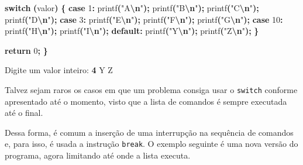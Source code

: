 \documentclass[
  11pt,
  a4paper,
]{scrbook}
\newenvironment{Shaded}{\begin{snugshade}}{\end{snugshade}}
\newcommand{\ControlFlowTok}[1]{\textcolor[rgb]{0.13,0.29,0.53}{\textbf{#1}}}
\newcommand{\DecValTok}[1]{\textcolor[rgb]{0.00,0.00,0.81}{#1}}
\newcommand{\KeywordTok}[1]{\textcolor[rgb]{0.13,0.29,0.53}{\textbf{#1}}}
\newcommand{\NormalTok}[1]{#1}
\newcommand{\OperatorTok}[1]{\textcolor[rgb]{0.81,0.36,0.00}{\textbf{#1}}}
\newcommand{\SpecialCharTok}[1]{\textcolor[rgb]{0.81,0.36,0.00}{\textbf{#1}}}
\newcommand{\StringTok}[1]{\textcolor[rgb]{0.31,0.60,0.02}{#1}}
\begin{document}
\begin{Shaded}
\begin{Highlighting}[]
    \ControlFlowTok{switch} \OperatorTok{(}\NormalTok{valor}\OperatorTok{)} \OperatorTok{\{}
        \ControlFlowTok{case} \DecValTok{1}\OperatorTok{:}
\NormalTok{            printf}\OperatorTok{(}\StringTok{"A}\SpecialCharTok{\textbackslash{}n}\StringTok{"}\OperatorTok{);}
\NormalTok{            printf}\OperatorTok{(}\StringTok{"B}\SpecialCharTok{\textbackslash{}n}\StringTok{"}\OperatorTok{);}
\NormalTok{            printf}\OperatorTok{(}\StringTok{"C}\SpecialCharTok{\textbackslash{}n}\StringTok{"}\OperatorTok{);}
\NormalTok{            printf}\OperatorTok{(}\StringTok{"D}\SpecialCharTok{\textbackslash{}n}\StringTok{"}\OperatorTok{);}
        \ControlFlowTok{case} \DecValTok{3}\OperatorTok{:}
\NormalTok{            printf}\OperatorTok{(}\StringTok{"E}\SpecialCharTok{\textbackslash{}n}\StringTok{"}\OperatorTok{);}
\NormalTok{            printf}\OperatorTok{(}\StringTok{"F}\SpecialCharTok{\textbackslash{}n}\StringTok{"}\OperatorTok{);}
\NormalTok{            printf}\OperatorTok{(}\StringTok{"G}\SpecialCharTok{\textbackslash{}n}\StringTok{"}\OperatorTok{);}
        \ControlFlowTok{case} \DecValTok{10}\OperatorTok{:}
\NormalTok{            printf}\OperatorTok{(}\StringTok{"H}\SpecialCharTok{\textbackslash{}n}\StringTok{"}\OperatorTok{);}
\NormalTok{            printf}\OperatorTok{(}\StringTok{"I}\SpecialCharTok{\textbackslash{}n}\StringTok{"}\OperatorTok{);}
        \ControlFlowTok{default}\OperatorTok{:}
\NormalTok{            printf}\OperatorTok{(}\StringTok{"Y}\SpecialCharTok{\textbackslash{}n}\StringTok{"}\OperatorTok{);}
\NormalTok{            printf}\OperatorTok{(}\StringTok{"Z}\SpecialCharTok{\textbackslash{}n}\StringTok{"}\OperatorTok{);}
    \OperatorTok{\}}

    \ControlFlowTok{return} \DecValTok{0}\OperatorTok{;}
\OperatorTok{\}}
\end{Highlighting}
\end{Shaded}

\begin{Shaded}
\begin{Highlighting}[]
\NormalTok{Digite um valor inteiro: }\KeywordTok{ 4 }
\NormalTok{Y}
\NormalTok{Z}
\end{Highlighting}
\end{Shaded}

Talvez sejam raros os casos em que um problema consiga usar o
\texttt{switch} conforme apresentado até o momento, visto que a lista de
comandos é sempre executada até o final.

Dessa forma, é comum a inserção de uma interrupção na sequência de
comandos e, para isso, é usada a instrução \texttt{break}. O exemplo
seguinte é uma nova versão do programa, agora limitando até onde a lista
executa.
\end{document}
